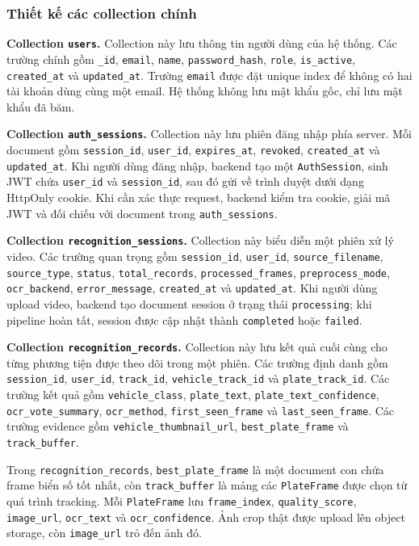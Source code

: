\subsubsection{Thiết kế các collection chính}

\textbf{Collection \texttt{users}.} Collection này lưu thông tin người dùng của hệ thống. Các trường chính gồm \texttt{\_id}, \texttt{email}, \texttt{name}, \texttt{password\_hash}, \texttt{role}, \texttt{is\_active}, \texttt{created\_at} và \texttt{updated\_at}. Trường \texttt{email} được đặt unique index để không có hai tài khoản dùng cùng một email. Hệ thống không lưu mật khẩu gốc, chỉ lưu mật khẩu đã băm.

\textbf{Collection \texttt{auth\_sessions}.} Collection này lưu phiên đăng nhập phía server. Mỗi document gồm \texttt{session\_id}, \texttt{user\_id}, \texttt{expires\_at}, \texttt{revoked}, \texttt{created\_at} và \texttt{updated\_at}. Khi người dùng đăng nhập, backend tạo một \texttt{AuthSession}, sinh JWT chứa \texttt{user\_id} và \texttt{session\_id}, sau đó gửi về trình duyệt dưới dạng HttpOnly cookie. Khi cần xác thực request, backend kiểm tra cookie, giải mã JWT và đối chiếu với document trong \texttt{auth\_sessions}.

\textbf{Collection \texttt{recognition\_sessions}.} Collection này biểu diễn một phiên xử lý video. Các trường quan trọng gồm \texttt{session\_id}, \texttt{user\_id}, \texttt{source\_filename}, \texttt{source\_type}, \texttt{status}, \texttt{total\_records}, \texttt{processed\_frames}, \texttt{preprocess\_mode}, \texttt{ocr\_backend}, \texttt{error\_message}, \texttt{created\_at} và \texttt{updated\_at}. Khi người dùng upload video, backend tạo document session ở trạng thái \texttt{processing}; khi pipeline hoàn tất, session được cập nhật thành \texttt{completed} hoặc \texttt{failed}.

\textbf{Collection \texttt{recognition\_records}.} Collection này lưu kết quả cuối cùng cho từng phương tiện được theo dõi trong một phiên. Các trường định danh gồm \texttt{session\_id}, \texttt{user\_id}, \texttt{track\_id}, \texttt{vehicle\_track\_id} và \texttt{plate\_track\_id}. Các trường kết quả gồm \texttt{vehicle\_class}, \texttt{plate\_text}, \texttt{plate\_text\_confidence}, \texttt{ocr\_vote\_summary}, \texttt{ocr\_method}, \texttt{first\_seen\_frame} và \texttt{last\_seen\_frame}. Các trường evidence gồm \texttt{vehicle\_thumbnail\_url}, \texttt{best\_plate\_frame} và \texttt{track\_buffer}.

Trong \texttt{recognition\_records}, \texttt{best\_plate\_frame} là một document con chứa frame biển số tốt nhất, còn \texttt{track\_buffer} là mảng các \texttt{PlateFrame} được chọn từ quá trình tracking. Mỗi \texttt{PlateFrame} lưu \texttt{frame\_index}, \texttt{quality\_score}, \texttt{image\_url}, \texttt{ocr\_text} và \texttt{ocr\_confidence}. Ảnh crop thật được upload lên object storage, còn \texttt{image\_url} trỏ đến ảnh đó.


